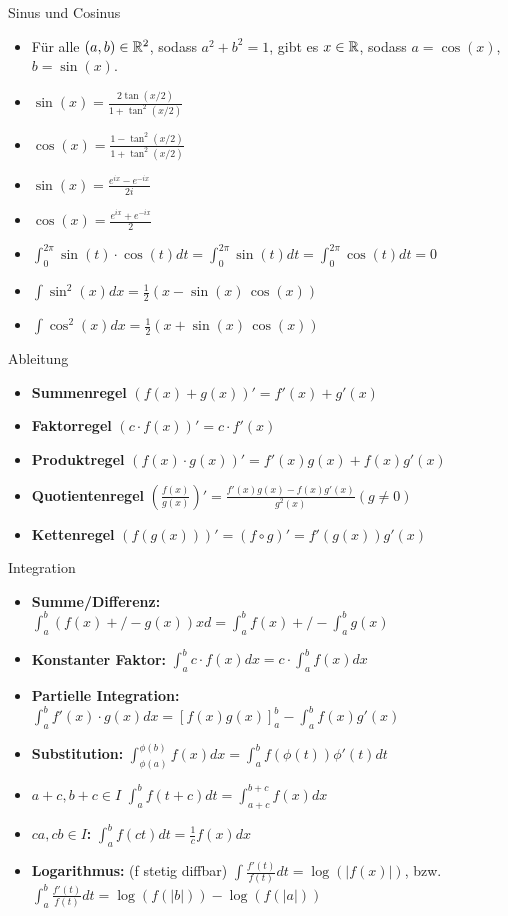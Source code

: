 \begin{Rechenregeln}{Sinus und Cosinus}{}
\begin{itemize}
    \item Für alle $(a,b)\in \mathbb{R}^2$, sodass $a^2+b^2 = 1$, gibt es $x\in\mathbb{R}$, sodass $a = \cos(x)$, $b = \sin(x)$.
    \item $\sin(x) = \frac{2\tan(x/2)}{1+\tan^2(x/2)}$
    \item $\cos(x) = \frac{1-\tan^2(x/2)}{1+\tan^2(x/2)}$
    \item $\sin(x) = \frac{e^{ix} - e^{-ix}}{2i}$
    \item $\cos(x) = \frac{e^{ix} + e^{-ix}}{2}$
    \item $\int_0^{2\pi} \sin(t)\cdot \cos(t) dt = \int_0^{2\pi} \sin(t) dt = \int_0^{2\pi} \cos(t) dt = 0$
    \item $\int \sin^2(x) dx = \frac{1}{2} (x-\sin(x) \, \cos(x))$
    \item $\int \cos^2(x) dx = \frac{1}{2} (x+\sin(x) \, \cos(x))$
    \end{itemize}
\end{Rechenregeln}

\begin{Rechenregeln}{Ableitung}{}
    \begin{itemize}
        \item \textbf{Summenregel} $(f(x)+g(x))' = f'(x) + g'(x)$
        \item \textbf{Faktorregel} $(c\cdot f(x))' = c\cdot f'(x)$
        \item \textbf{Produktregel} $(f(x)\cdot g(x))' = f'(x)g(x) + f(x)g'(x)$
        \item \textbf{Quotientenregel} $\left(\frac{f(x)}{g(x)}\right)' = \frac{f'(x)g(x) - f(x)g'(x)}{g^2(x)}(g\neq 0)$
        \item \textbf{Kettenregel} $(f(g(x)))' = (f\circ g)' = f'(g(x))g'(x)$
    \end{itemize}
\end{Rechenregeln}

\begin{Rechenregeln}{Integration}{}
    \begin{itemize}
    \item \textbf{Summe/Differenz:} $\int_a^b (f(x) +/- g(x)) xd = \int_a^b f(x) +/- \int_a^b g(x)$
    \item \textbf{Konstanter Faktor:} $\int_a^b c\cdot f(x)dx = c\cdot \int_a^b f(x)dx$
    \item \textbf{Partielle Integration:} $\int_a^b f'(x)\cdot g(x)dx = \left[f(x)g(x)\right]_a^b - \int_a^b f(x)g'(x)$
    \item \textbf{Substitution:} $\int_{\phi(a)}^{\phi(b)} f(x)dx = \int_a^b f(\phi(t))\phi '(t) dt$
    \item \textbf{$a+c, b+c \in I$} $\int_a^b f(t+c)dt = \int_{a+c}^{b+c} f(x)dx$
    \item \textbf{$ca,cb\in I$: } $\int_a^b f(ct)dt = \frac{1}{c}f(x)dx$
    \item \textbf{Logarithmus: }\;(f stetig diffbar) $\int\frac{f'(t)}{f(t)}dt = \log(|f(x)|)$, bzw. $\int_a^b\frac{f'(t)}{f(t)}dt = \log(f(|b|)) - \log(f(|a|))$
    \end{itemize}
\end{Rechenregeln}

